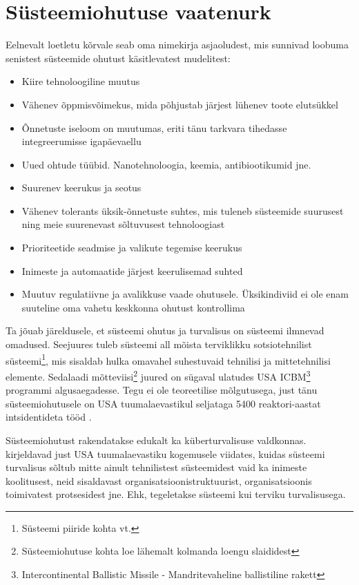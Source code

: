 \documentclass{tufte-book}
\begin{document}
\section{Süsteemiohutuse vaatenurk}
Eelnevalt loetletu kõrvale seab \cite{leveson2011engineering} oma nimekirja asjaoludest, mis sunnivad loobuma senistest süsteemide ohutust käsitlevatest mudelitest:
\begin{itemize}
	\item Kiire tehnoloogiline muutus
	\item Vähenev õppmisvõimekus, mida põhjustab järjest lühenev toote elutsükkel
	\item Õnnetuste iseloom on muutumas, eriti tänu tarkvara tihedasse integreerumisse igapäevaellu
	\item Uued ohtude tüübid. Nanotehnoloogia, keemia, antibiootikumid jne.
	\item Suurenev keerukus ja seotus
	\item Vähenev tolerants üksik-õnnetuste suhtes, mis tuleneb süsteemide suurusest ning meie suurenevast sõltuvusest tehnoloogiast
	\item Prioriteetide seadmise ja valikute tegemise keerukus
	\item Inimeste ja automaatide järjest keerulisemad suhted
	\item Muutuv regulatiivne ja avalikkuse vaade ohutusele. Üksikindiviid ei ole enam suuteline oma vahetu keskkonna ohutust kontrollima
\end{itemize}

Ta jõuab järeldusele, et süsteemi ohutus ja turvalisus on süsteemi ilmnevad omadused. Seejuures tuleb süsteemi all mõista terviklikku sotsiotehnilist süsteemi\footnote{Süsteemi piiride kohta vt. }, mis sisaldab hulka omavahel suhestuvaid tehnilisi ja mittetehnilisi elemente. Sedalaadi mõtteviisi\footnote{Süsteemiohutuse kohta loe lähemalt kolmanda loengu slaididest} juured on sügaval ulatudes USA ICBM\footnote{Intercontinental Ballistic Missile - Mandritevaheline ballistiline rakett} programmi algusaegadesse. Tegu ei ole teoreetilise mõlgutusega, just tänu süsteemiohutusele on USA tuumalaevastikul seljataga 5400 reaktori-aastat intsidentideta tööd \cite{navy}. 

Süsteemiohutust rakendatakse edukalt ka küberturvalisuse valdkonnas. \citeauthor{hbrcyber} kirjeldavad just USA tuumalaevastiku kogemusele viidates, kuidas süsteemi turvalisus sõltub mitte ainult tehnilistest süsteemidest vaid ka inimeste koolitusest, neid sisaldavast organisatsioonistruktuurist, organisatsioonis toimivatest protsesidest jne. Ehk, tegeletakse süsteemi kui terviku turvalisusega.\cite{hbrcyber} 
\end{document}
